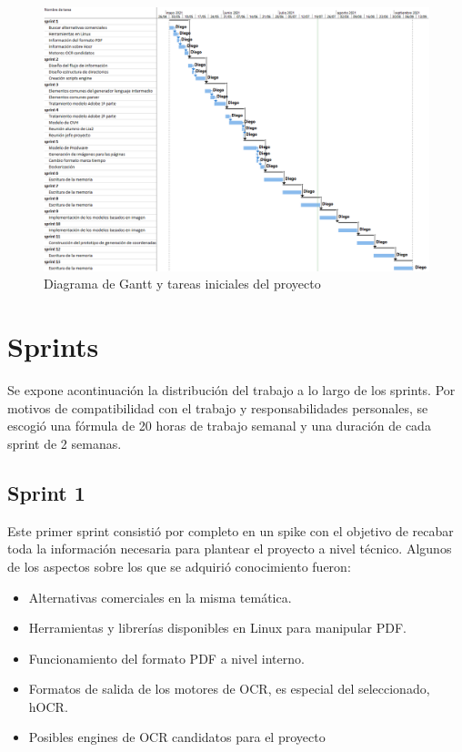 \begin{figure}[hp!]
    \centering
    \includegraphics[angle=90,width=1.0\textwidth]{imaxes/f-planificacion/gantt-inicial.png}
    \caption{Diagrama de Gantt y tareas iniciales del proyecto}
    \label{fig:gantt-inicial}
\end{figure}

\section{Sprints}

Se expone acontinuación la distribución del trabajo a lo largo de los sprints. Por motivos de compatibilidad con el trabajo y responsabilidades personales, se escogió una fórmula de 20 horas de trabajo semanal y una duración de cada sprint de 2 semanas.

\subsection{Sprint 1}

Este primer sprint consistió por completo en un spike con el objetivo de recabar toda la información necesaria para plantear el proyecto a nivel técnico. Algunos de los aspectos sobre los que se adquirió conocimiento fueron:

\begin{itemize}
    \item Alternativas comerciales en la misma temática.
    \item Herramientas y librerías disponibles en Linux para manipular PDF.
    \item Funcionamiento del formato PDF a nivel interno.
    \item Formatos de salida de los motores de OCR, es especial del seleccionado, hOCR.
    \item Posibles engines de OCR candidatos para el proyecto
\end{itemize}

